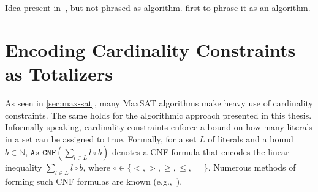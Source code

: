Idea present in~\autocite{DBLP:journals/tcad/XuRS03}, but not phrased as algorithm.
\Autocite{DBLP:conf/sat/FuM06} first to phrase it as an algorithm.

\section{Encoding Cardinality Constraints as Totalizers\label{sec:card-const}}


As seen in \cref{sec:max-sat}, many MaxSAT algorithms make heavy use of cardinality constraints.
The same holds for the algorithmic approach presented in this thesis.
Informally speaking, cardinality constraints enforce a bound on how many literals in a set can be assigned to true.
Formally, for a set $L$ of literals and a bound $b \in \mathbb{N}$, $\texttt{As-CNF}\left(\sum_{l \in L} l \circ b\right)$ denotes a CNF formula that encodes the linear inequality $\sum_{l \in L} l \circ b$, where $\circ \in \{< ,> ,\geq, \leq, =\}$.
Numerous methods of forming such CNF formulas are known (e.g.,~\autocites{DBLP:conf/cp/BailleuxB03,DBLP:conf/cp/Sinz05,DBLP:journals/jsat/EenS06}).

